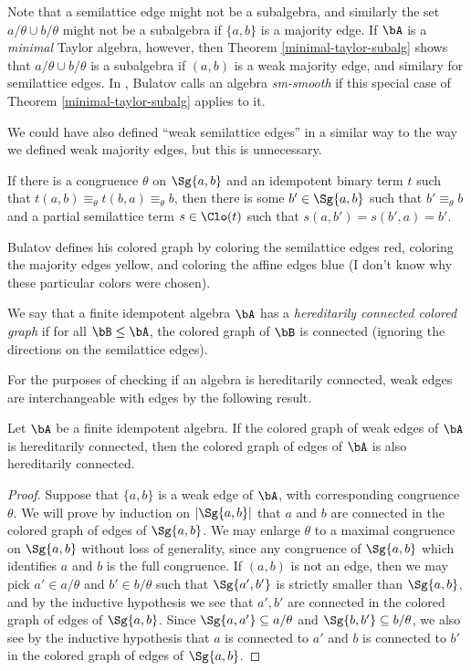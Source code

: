 Note that a semilattice edge might not be a subalgebra, and similarly the set $a/\theta \cup b/\theta$ might not be a subalgebra if $\{a,b\}$ is a majority edge. If $\bA$ is a \emph{minimal} Taylor algebra, however, then Theorem \ref{minimal-taylor-subalg} shows that $a/\theta \cup b/\theta$ is a subalgebra if $(a,b)$ is a weak majority edge, and similary for semilattice edges. In \cite{bulatov-dichotomy}, Bulatov calls an algebra \emph{sm-smooth} if this special case of Theorem \ref{minimal-taylor-subalg} applies to it.

We could have also defined ``weak semilattice edges'' in a similar way to the way we defined weak majority edges, but this is unnecessary.

\begin{prop}\label{prop-weak-semilattice-edge} If there is a congruence $\theta$ on $\Sg\{a,b\}$ and an idempotent binary term $t$ such that $t(a,b) \equiv_\theta t(b,a) \equiv_\theta b$, then there is some $b' \in \Sg\{a,b\}$ such that $b' \equiv_\theta b$ and a partial semilattice term $s \in \Clo(t)$ such that $s(a,b') = s(b',a) = b'$.
\end{prop}

Bulatov defines his colored graph by coloring the semilattice edges red, coloring the majority edges yellow, and coloring the affine edges blue (I don't know why these particular colors were chosen).

\begin{defn} We say that a finite idempotent algebra $\bA$ has a \emph{hereditarily connected colored graph} if for all $\bB \le \bA$, the colored graph of $\bB$ is connected (ignoring the directions on the semilattice edges).
\end{defn}

For the purposes of checking if an algebra is hereditarily connected, weak edges are interchangeable with edges by the following result.

\begin{prop} Let $\bA$ be a finite idempotent algebra. If the colored graph of weak edges of $\bA$ is hereditarily connected, then the colored graph of edges of $\bA$ is also hereditarily connected.
\end{prop}
\begin{proof} Suppose that $\{a,b\}$ is a weak edge of $\bA$, with corresponding congruence $\theta$. We will prove by induction on $|\Sg\{a,b\}|$ that $a$ and $b$ are connected in the colored graph of edges of $\Sg\{a,b\}$. We may enlarge $\theta$ to a maximal congruence on $\Sg\{a,b\}$ without loss of generality, since any congruence of $\Sg\{a,b\}$ which identifies $a$ and $b$ is the full congruence. If $(a,b)$ is not an edge, then we may pick $a' \in a/\theta$ and $b' \in b/\theta$ such that $\Sg\{a',b'\}$ is strictly smaller than $\Sg\{a,b\}$, and by the inductive hypothesis we see that $a',b'$ are connected in the colored graph of edges of $\Sg\{a,b\}$. Since $\Sg\{a,a'\} \subseteq a/\theta$ and $\Sg\{b,b'\} \subseteq b/\theta$, we also see by the inductive hypothesis that $a$ is connected to $a'$ and $b$ is connected to $b'$ in the colored graph of edges of $\Sg\{a,b\}$.
\end{proof}

